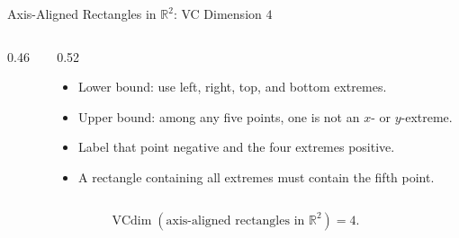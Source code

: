 \documentclass[aspectratio=169,10pt]{beamer}
\newcommand{\vcdim}{\operatorname{VCdim}}
\begin{document}
\begin{frame}[t]{Axis-Aligned Rectangles in $\mathbb{R}^2$: VC Dimension $4$}
  \vspace{0.01cm}
  \begin{columns}[T,totalwidth=\textwidth]
    \begin{column}{0.46\textwidth}
      \begin{center}
      \end{center}
    \end{column}
    \begin{column}{0.52\textwidth}
      {\small
      \begin{itemize}
        \setlength{\itemsep}{0.10cm}
        \item Lower bound: use left, right, top, and bottom extremes.
        \item Upper bound: among any five points, one is not an $x$- or $y$-extreme.
        \item Label that point negative and the four extremes positive.
        \item A rectangle containing all extremes must contain the fifth point.
      \end{itemize}}
    \end{column}
  \end{columns}
  \vspace{0.01cm}
  \[
    \boxed{\vcdim(\text{axis-aligned rectangles in }\mathbb{R}^2)=4.}
  \]
\end{frame}
\end{document}
